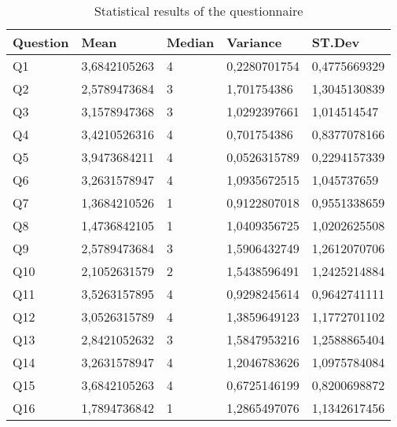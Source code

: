 \begin{table}[!ht]
	\centering
	\caption{Statistical results of the questionnaire}
	\label{tab:stat_results}
	\begin{tabular}{|l|l|l|l|l|}
		\hline
		\textbf{Question} & \textbf{Mean} & \textbf{Median} & \textbf{Variance} & \textbf{ST.Dev} \\ \hline
		Q1                & 3,6842105263  & 4               & 0,2280701754      & 0,4775669329    \\ \hline
		Q2                & 2,5789473684  & 3               & 1,701754386       & 1,3045130839    \\ \hline
		Q3                & 3,1578947368  & 3               & 1,0292397661      & 1,014514547     \\ \hline
		Q4                & 3,4210526316  & 4               & 0,701754386       & 0,8377078166    \\ \hline
		Q5                & 3,9473684211  & 4               & 0,0526315789      & 0,2294157339    \\ \hline
		Q6                & 3,2631578947  & 4               & 1,0935672515      & 1,045737659     \\ \hline
		Q7                & 1,3684210526  & 1               & 0,9122807018      & 0,9551338659    \\ \hline
		Q8                & 1,4736842105  & 1               & 1,0409356725      & 1,0202625508    \\ \hline
		Q9                & 2,5789473684  & 3               & 1,5906432749      & 1,2612070706    \\ \hline
		Q10               & 2,1052631579  & 2               & 1,5438596491      & 1,2425214884    \\ \hline
		Q11               & 3,5263157895  & 4               & 0,9298245614      & 0,9642741111    \\ \hline
		Q12               & 3,0526315789  & 4               & 1,3859649123      & 1,1772701102    \\ \hline
		Q13               & 2,8421052632  & 3               & 1,5847953216      & 1,2588865404    \\ \hline
		Q14               & 3,2631578947  & 4               & 1,2046783626      & 1,0975784084    \\ \hline
		Q15               & 3,6842105263  & 4               & 0,6725146199      & 0,8200698872    \\ \hline
		Q16               & 1,7894736842  & 1               & 1,2865497076      & 1,1342617456    \\ \hline

\end{tabular}
\end{table}
